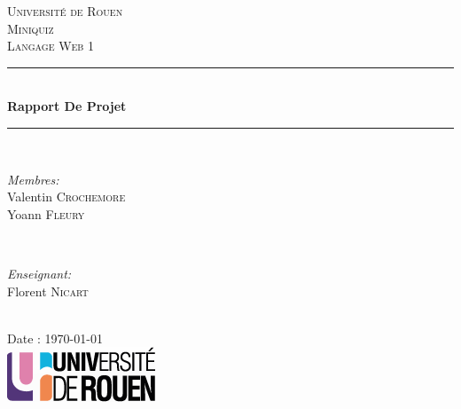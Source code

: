 \documentclass[12pt]{article}
\begin{document}
\begin{titlepage}

\newcommand{\HRule}{\rule{\linewidth}{0.5mm}}

\center

\textsc{\LARGE Université de Rouen}\\[1.5cm]
\textsc{\Large Miniquiz}\\[0.5cm]
\textsc{\large Langage Web 1}\\[0.5cm]

\HRule \\[0.4cm]
{ \huge \bfseries Rapport De Projet}\\[0.2cm] %
\HRule \\[1.5cm]

  \begin{minipage}{0.4\textwidth}
    \begin{flushleft} \large
      \emph{Membres:}\\
      Valentin \textsc{Crochemore}\\
      Yoann \textsc{Fleury}
    \end{flushleft}
  \end{minipage}
  ~
  \begin{minipage}{0.4\textwidth}
    \begin{flushright} \large
      \emph{Enseignant:} \\
      Florent \textsc{Nicart}
    \end{flushright}
  \end{minipage}\\[3cm]


  {\large Date : \today}\\[3cm]

  \includegraphics{res/logo.png}\\[1cm]

  \vfill
\end{titlepage}

\newpage
\tableofcontents
\newpage
\end{document}
